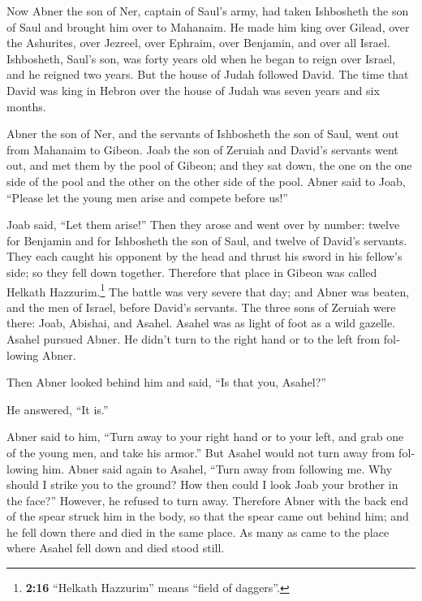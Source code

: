 \begin{paracol}{2}
\begin{otherlanguage}{english}
 Now Abner the son of Ner, captain of Saul's army, had
taken Ishbosheth the son of Saul and brought him over to Mahanaim.
 He made him king over Gilead, over the Ashurites, over
Jezreel, over Ephraim, over Benjamin, and over all Israel.
 Ishbosheth, Saul's son, was forty years old when he
began to reign over Israel, and he reigned two years. But the house of
Judah followed David.  The time that David was king in
Hebron over the house of Judah was seven years and six months.

 Abner the son of Ner, and the servants of Ishbosheth the
son of Saul, went out from Mahanaim to Gibeon.  Joab the
son of Zeruiah and David's servants went out, and met them by the pool
of Gibeon; and they sat down, the one on the one side of the pool and
the other on the other side of the pool.  Abner said to
Joab, ``Please let the young men arise and compete before us!''

Joab said, ``Let them arise!''  Then they arose and went
over by number: twelve for Benjamin and for Ishbosheth the son of Saul,
and twelve of David's servants.  They each caught his
opponent by the head and thrust his sword in his fellow's side; so they
fell down together. Therefore that place in Gibeon was called Helkath
Hazzurim.\footnote{\textbf{2:16} ``Helkath Hazzurim'' means ``field of
  daggers''.}  The battle was very severe that day; and
Abner was beaten, and the men of Israel, before David's servants.
 The three sons of Zeruiah were there: Joab, Abishai, and
Asahel. Asahel was as light of foot as a wild gazelle. 
Asahel pursued Abner. He didn't turn to the right hand or to the left
from following Abner.

 Then Abner looked behind him and said, ``Is that you,
Asahel?''

He answered, ``It is.''

 Abner said to him, ``Turn away to your right hand or to
your left, and grab one of the young men, and take his armor.'' But
Asahel would not turn away from following him.  Abner
said again to Asahel, ``Turn away from following me. Why should I strike
you to the ground? How then could I look Joab your brother in the
face?''  However, he refused to turn away. Therefore
Abner with the back end of the spear struck him in the body, so that the
spear came out behind him; and he fell down there and died in the same
place. As many as came to the place where Asahel fell down and died
stood still.


\end{otherlanguage}
\end{paracol}

